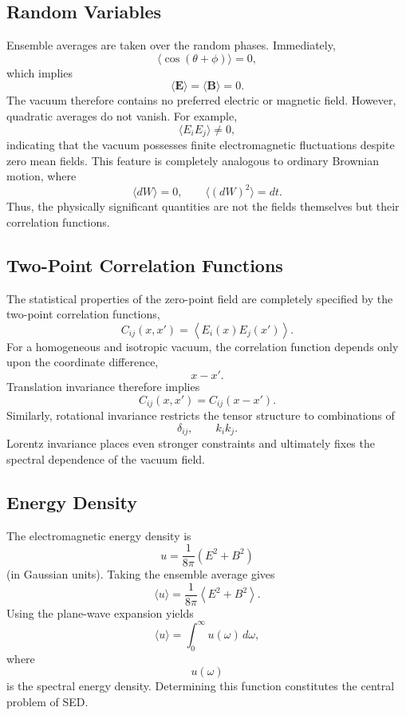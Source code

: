 \subsection{Random Variables}
Ensemble averages are taken over the random phases.
Immediately,
\[\langle\cos(\theta+\phi)\rangle=0,\]
which implies
\begin{equation}
\boxed{\langle\mathbf E\rangle=\langle\mathbf B\rangle=0.}
\end{equation}
The vacuum therefore contains no preferred electric or magnetic field.
However,
quadratic averages do not vanish.
For example,
\[\langle E_iE_j\rangle\neq0,\]
indicating that the vacuum possesses finite electromagnetic
fluctuations despite zero mean fields.
This feature is completely analogous to ordinary Brownian motion, where
\[\langle dW\rangle=0,\qquad\langle(dW)^2\rangle=dt.\]
Thus,
the physically significant quantities are not the fields themselves but
their correlation functions.
\subsection{Two-Point Correlation Functions}
The statistical properties of the zero-point field are completely
specified by the two-point correlation functions,
\begin{equation}
C_{ij}(x,x')=\left<E_i(x)E_j(x')\right>.
\end{equation}
For a homogeneous and isotropic vacuum,
the correlation function depends only upon the coordinate difference,
\[x-x'.\]
Translation invariance therefore implies
\[C_{ij}(x,x')=C_{ij}(x-x').\]
Similarly,
rotational invariance restricts the tensor structure to combinations of
\[\delta_{ij},\qquad k_ik_j.\]
Lorentz invariance places even stronger constraints and ultimately fixes
the spectral dependence of the vacuum field.
\subsection{Energy Density}
The electromagnetic energy density is
\begin{equation}
u=\frac1{8\pi}(E^2+B^2)
\end{equation}
(in Gaussian units).
Taking the ensemble average gives
\[\langle u\rangle=\frac1{8\pi}\left<E^2+B^2\right>.\]
Using the plane-wave expansion yields
\begin{equation}
\langle u\rangle=\int_0^\infty u(\omega)\,d\omega,
\end{equation}
where
\[u(\omega)\]
is the spectral energy density.
Determining this function constitutes the central problem of SED.
